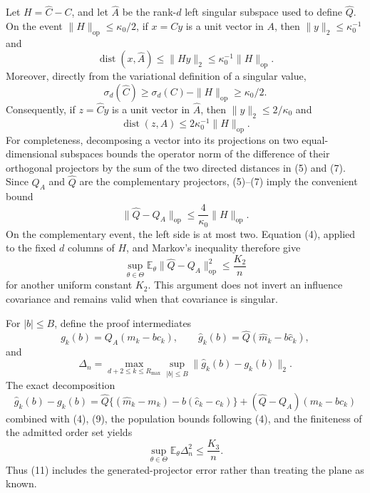Let \(H=\widehat C-C\), and let \(\widehat A\) be the rank-\(d\) left singular subspace used to define \(\widehat Q\).  On the event \(\|H\|_{\mathrm{op}}\leq\kappa_0/2\), if \(x=Cy\) is a unit vector in \(A\), then \(\|y\|_2\leq\kappa_0^{-1}\) and
\[
 \operatorname{dist}(x,\widehat A)
 \leq\|Hy\|_2\leq\kappa_0^{-1}\|H\|_{\mathrm{op}}. \tag{5}
\]
Moreover, directly from the variational definition of a singular value,
\[
 \sigma_d(\widehat C)
 \geq\sigma_d(C)-\|H\|_{\mathrm{op}}
 \geq\kappa_0/2. \tag{6}
\]
Consequently, if \(z=\widehat Cy\) is a unit vector in \(\widehat A\), then \(\|y\|_2\leq2/\kappa_0\) and
\[
 \operatorname{dist}(z,A)\leq2\kappa_0^{-1}\|H\|_{\mathrm{op}}. \tag{7}
\]
For completeness, decomposing a vector into its projections on two equal-dimensional subspaces bounds the operator norm of the difference of their orthogonal projectors by the sum of the two directed distances in (5) and (7).  Since \(Q_A\) and \(\widehat Q\) are the complementary projectors, (5)--(7) imply the convenient bound
\[
 \|\widehat Q-Q_A\|_{\mathrm{op}}
 \leq\frac{4}{\kappa_0}\|H\|_{\mathrm{op}}. \tag{8}
\]
On the complementary event, the left side is at most two.  Equation (4), applied to the fixed \(d\) columns of \(H\), and Markov's inequality therefore give
\[
 \sup_{\theta\in\Theta}
 \mathbb E_\theta\|\widehat Q-Q_A\|_{\mathrm{op}}^2
 \leq\frac{K_2}{n} \tag{9}
\]
for another uniform constant \(K_2\).  This argument does not invert an influence covariance and remains valid when that covariance is singular.

For \(|b|\leq B\), define the proof intermediates
\[
 g_k(b)=Q_A(m_k-bc_k),\qquad
 \widehat g_k(b)=\widehat Q(\widehat m_k-b\widehat c_k),
\]
and
\[
 \Delta_n=\max_{d+2\leq k\leq R_{\max}}
 \sup_{|b|\leq B}\|\widehat g_k(b)-g_k(b)\|_2.
\]
The exact decomposition
\[
 \widehat g_k(b)-g_k(b)
 =\widehat Q\{(\widehat m_k-m_k)-b(\widehat c_k-c_k)\}
  +(\widehat Q-Q_A)(m_k-bc_k) \tag{10}
\]
combined with (4), (9), the population bounds following (4), and the finiteness of the admitted order set yields
\[
 \sup_{\theta\in\Theta}\mathbb E_\theta\Delta_n^2\leq\frac{K_3}{n}. \tag{11}
\]
Thus (11) includes the generated-projector error rather than treating the plane as known.

